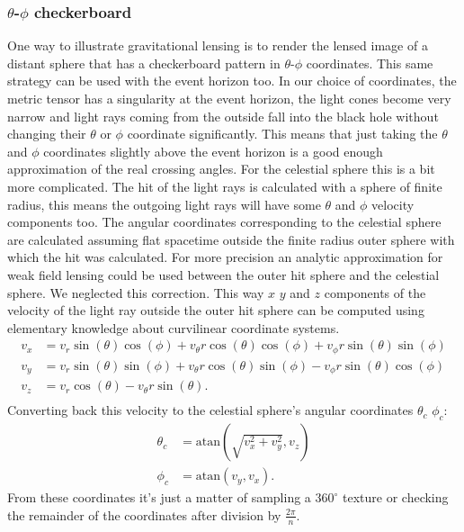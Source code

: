 \documentclass[pdftex,12pt,a4paper]{article}
\begin{document}
	\subsubsection{$\theta$-$\phi$ checkerboard}
		One way to illustrate gravitational lensing is to render the lensed image of a distant sphere that has a checkerboard pattern in $\theta$-$\phi$ coordinates. This same strategy can be used with the event horizon too. In our choice of coordinates, the metric tensor has a singularity at the event horizon, the light cones become very narrow and light rays coming from the outside fall into the black hole without changing their $\theta$ or $\phi$ coordinate significantly. This means that just taking the $\theta$ and $\phi$ coordinates slightly above the event horizon is a good enough approximation of the real crossing angles. For the celestial sphere this is a bit more complicated. The hit of the light rays is calculated with a sphere of finite radius, this means the outgoing light rays will have some $\theta$ and $\phi$ velocity components too. The angular coordinates corresponding to the celestial sphere are calculated assuming flat spacetime outside the finite radius outer sphere with which the hit was calculated. For more precision an analytic approximation for weak field lensing could be used between the outer hit sphere and the celestial sphere. We neglected this correction. This way $x$ $y$ and $z$ components of the velocity of the light ray outside the outer hit sphere can be computed using elementary knowledge about curvilinear coordinate systems.
		\begin{equation}
		\begin{aligned}
			v_x &= v_r\sin(\theta)\cos(\phi) + v_\theta r\cos(\theta)\cos(\phi) + v_\phi r\sin(\theta)\sin(\phi)\\
			v_y &= v_r\sin(\theta)\sin(\phi) + v_\theta r\cos(\theta)\sin(\phi) - v_\phi r\sin(\theta)\cos(\phi)\\
			v_z &= v_r\cos(\theta) - v_\theta r\sin(\theta).\\
		\end{aligned}
		\end{equation}
		Converting back this velocity to the celestial sphere's angular coordinates $\theta_c$ $\phi_c$:
		\begin{equation}
		\begin{aligned}
			\theta_c &= \mathrm{atan}(\sqrt{v_x^2+v_y^2}, v_z)\\
			\phi_c   &= \mathrm{atan}(v_y, v_x).
		\end{aligned}
		\end{equation}
		From these coordinates it's just a matter of sampling a $360^\circ$ texture or checking the remainder of the coordinates after division by $\frac{2\pi}{n}$.
\end{document}
